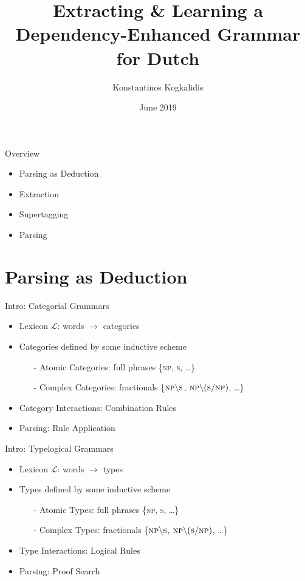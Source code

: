 \documentclass{beamer}
\title{Extracting \& Learning a Dependency-Enhanced Grammar for Dutch}
\author{Konstantinos Kogkalidis}
\date{June 2019}
\begin{document}
\maketitle

\begin{frame}{Overview}
	\begin{itemize}
	\item Parsing as Deduction
	\item Extraction
	\item Supertagging
	\item Parsing
	\end{itemize}
\end{frame}

\section{Parsing as Deduction}

\begin{frame}{Intro: Categorial Grammars}
\begin{itemize}
	\item Lexicon $\mathcal{L}$: words $\to$ categories
	\item Categories defined by some inductive scheme
	\begin{itemize}
		\item[-] Atomic Categories: full phrases \{\textsc{np}, \textsc{s}, \dots\}
		\item[-] Complex Categories: fractionals \{$\textsc{np}\backslash \textsc{s}$, $\textsc{np}\backslash (\textsc{s}/\textsc{np})$, \dots\}
	\end{itemize}
	\item Category Interactions: Combination Rules
	\item Parsing: Rule Application
\end{itemize}
\end{frame}

\begin{frame}{Intro: Typelogical Grammars}
\begin{itemize}
	\item Lexicon $\mathcal{L}$: words $\to$ \alert{types}
	\item Types defined by some inductive scheme
	\begin{itemize}
		\item[-] Atomic Types: full phrases \{\textsc{np}, \textsc{s}, \dots\}
		\item[-] Complex Types: fractionals \{$\textsc{np}\backslash \textsc{s}$, $\textsc{np}\backslash (\textsc{s}/\textsc{np})$, \dots\}
	\end{itemize}
	\item Type Interactions: \alert{Logical Rules}
	\item Parsing: \alert{Proof Search}
\end{itemize}
\end{frame}
\end{document}
